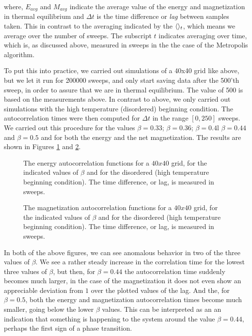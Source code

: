 \documentclass[11pt,a4paper]{article}
\DeclarePairedDelimiter{\avg}{\langle}{\rangle}
\begin{document}
where, $E_{avg}$ and $M_{avg}$ indicate the average value of the energy and magnetization in thermal equilibrium and $\Delta t$
 is the time difference or \textit{lag} between samples taken.
 This in contrast to the averaging indicated by the $\avg{}_t$, which means we average over the number of
 sweeps. The subscript $t$ indicates averaging over time, which is, as discussed above, measured in sweeps in the
 the case of the Metropolis algorithm. 

To put this into practice, we carried out simulations of a 40x40 grid like above, but we let it run for 200000 sweeps, and only 
 start saving data after the 500'th sweep, in order to assure that we are in thermal equilibrium. The value of 500 is based on the
 measurements above. In contrast to above, we only carried out simulations with the high temperature (disordered) beginning condition. 
 The autocorrelation times were then computed for $\Delta t$ in the range $[0,250]$ sweeps. We carried out this procedure for the values
 $\beta = 0.33$; $\beta = 0.36$; $\beta = 0.4$l $\beta = 0.44$ and $\beta = 0.5$ and for both the energy and the net magnetization. The 
 results are shown in Figures \ref{fig:ac_energy} and \ref{fig:ac_mag}. 

\begin{figure}[H]

  \caption{The energy autocorrelation functions for a $40x40$ grid, for the indicated values of $\beta$ and for the disordered (high 
    temperature beginning condition). The time difference, or lag, is measured in sweeps.}

\label{fig:ac_energy}
\end{figure}


\begin{figure}[H]

  \caption{The magnetization autocorrelation functions for a $40x40$ grid, for the indicated values of $\beta$ and for the disordered (high 
    temperature beginning condition). The time difference, or lag, is measured in sweeps.}

\label{fig:ac_mag}
\end{figure}

In both of the above figures, we can see anomalous behavior in two of the three values of $\beta$. We see a rather steady increase
 in the correlation time for the lowest three values of $\beta$, but then, for $\beta = 0.44$ the autocorrelation time suddenly
 becomes much larger, in the case of the magnetization it does not even show an appreciable deviation from $1$ over the plotted 
 values of the lag. And the, for $\beta = 0.5$, both the energy and magnetization autocorrelation times become much smaller, going
 below the lower $\beta$ values. This can be interpreted as an an indication that something is happening to the system around the 
 value $\beta = 0.44$, perhaps the first sign of a phase transition. 
\end{document}
